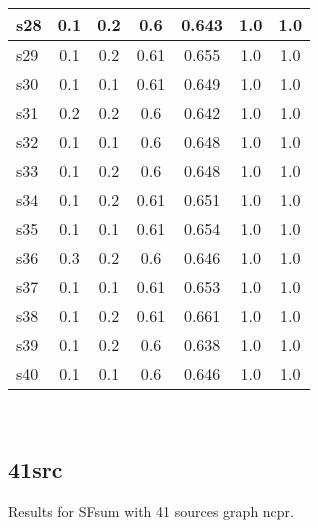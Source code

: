 \documentclass{article}
\begin{document}
\begin{tabular}{|l|c|c|c|c|c|c|}
\hline
s28 &0.1 & 0.2 & 0.6 & 0.643 & 1.0 & 1.0\\
\hline
s29 &0.1 & 0.2 & 0.61 & 0.655 & 1.0 & 1.0\\
\hline
s30 &0.1 & 0.1 & 0.61 & 0.649 & 1.0 & 1.0\\
\hline
s31 &0.2 & 0.2 & 0.6 & 0.642 & 1.0 & 1.0\\
\hline
s32 &0.1 & 0.1 & 0.6 & 0.648 & 1.0 & 1.0\\
\hline
s33 &0.1 & 0.2 & 0.6 & 0.648 & 1.0 & 1.0\\
\hline
s34 &0.1 & 0.2 & 0.61 & 0.651 & 1.0 & 1.0\\
\hline
s35 &0.1 & 0.1 & 0.61 & 0.654 & 1.0 & 1.0\\
\hline
s36 &0.3 & 0.2 & 0.6 & 0.646 & 1.0 & 1.0\\
\hline
s37 &0.1 & 0.1 & 0.61 & 0.653 & 1.0 & 1.0\\
\hline
s38 &0.1 & 0.2 & 0.61 & 0.661 & 1.0 & 1.0\\
\hline
s39 &0.1 & 0.2 & 0.6 & 0.638 & 1.0 & 1.0\\
\hline
s40 &0.1 & 0.1 & 0.6 & 0.646 & 1.0 & 1.0\\
\hline
\end{tabular}\\

\newpage

\subsection{41src}

\noindent Results for SFsum with 41 sources graph ncpr.
\end{document}
